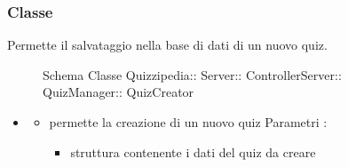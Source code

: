 \subsubsection{Classe }
Permette il salvataggio nella base di dati di un nuovo quiz.
\begin{figure}[H]
\centering
\noindent{}
\caption[Schema Classe QuizCreator]{Schema Classe Quizzipedia:: Server:: ControllerServer:: QuizManager:: QuizCreator}
\end{figure}
\begin{itemize}
\item {}
\begin{itemize}
\item {}
\newline
permette la creazione di un nuovo quiz
\newline
Parametri :
\begin{itemize}
\item {}
\newline
struttura contenente i dati del quiz da creare
\end{itemize}
\end{itemize}
\end{itemize}

